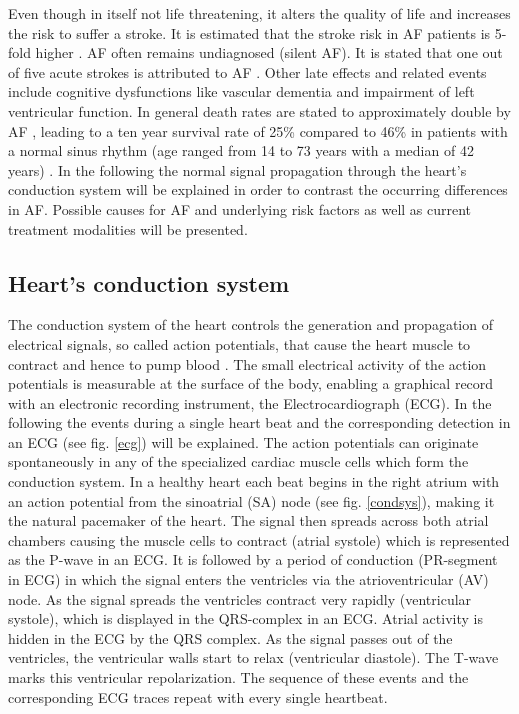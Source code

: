 Even though in itself not life threatening, it alters the quality of life and increases the risk to suffer a stroke. It is 
estimated that the stroke risk in AF patients is 5-fold higher \cite{Ben98, Wol91}. AF often remains undiagnosed 
(silent AF). It is stated that one out of five acute strokes is attributed to AF \cite{ESC10}. Other late effects and related events 
include cognitive dysfunctions like vascular dementia and impairment of left ventricular function. In general death rates are stated to 
approximately double by AF \cite{ESC10}, leading to a ten year survival rate of 25\% compared to 46\% in patients with a normal sinus 
rhythm (age ranged from 14 to 73 years with a median of 42 years) \cite{Oles62, ACC06}.\newline
\newline
In the following the normal signal propagation through the heart's conduction system will be explained in order to contrast the occurring 
differences in AF. Possible causes for AF and underlying risk factors as well as current treatment modalities will be presented.

\newpage

\subsection{Heart's conduction system}
\label{HCS}
The conduction system of the heart controls the generation and propagation of electrical signals, so called action potentials, that cause 
the heart muscle to contract and hence to pump blood \cite{Med}. The small electrical activity of the action potentials is measurable at the 
surface of the body, enabling a graphical record with an electronic recording instrument, the Electrocardiograph (ECG). In the following the 
events during a single heart beat and the corresponding detection in an ECG (see fig. \ref{ecg}) will be explained. 
The action potentials can originate spontaneously in any of the specialized cardiac muscle cells which form the conduction system. In a healthy 
heart each beat begins in the right atrium with an action potential from the sinoatrial (SA) node (see fig. \ref{condsys}), making it the 
natural pacemaker of the heart. The signal then spreads across both atrial chambers causing the muscle cells to contract (atrial systole) 
which is represented as the P-wave in an ECG. It is followed by a period of conduction (PR-segment in ECG) in which the signal enters the 
ventricles via the atrioventricular (AV) node. As the signal spreads the ventricles contract very rapidly 
(ventricular systole), which is displayed in the QRS-complex in an ECG. Atrial activity is hidden in the ECG by the QRS complex. As the signal 
passes out of the ventricles, the ventricular walls start to relax (ventricular diastole). The T-wave marks this ventricular repolarization. 
The sequence of these events and the corresponding ECG traces repeat with every single heartbeat.\newline

